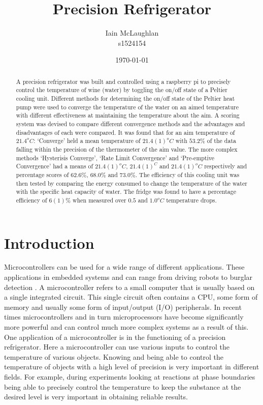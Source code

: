 \documentclass[10pt]{article}
\title{Precision Refrigerator}
\author{Iain McLaughlan\\ s1524154 }
\date{\today}
\begin{document}
\maketitle
\begin{abstract}
A precision refrigerator was built and controlled using a raspberry pi to precisely control the temperature of wine (water) by toggling the on/off state of a Peltier\cite{peltier}\cite{pelt} cooling unit. Different methods for determining the on/off state of the Peltier heat pump were used to converge the temperature of the water on an aimed temperature with different effectiveness at maintaining the temperature about the aim. A scoring system was devised to compare different convergence methods and the advantages and disadvantages of each were compared. It was found that for an aim temperature of $21.4^oC$: `Converge' held a mean temperature of $21.4(1)^oC$ with $53.2\%$ of the data falling within the precision of the thermometer of the aim value. The more complex methods `Hysterisis Converge', `Rate Limit Convergence' and `Pre-emptive Convergence' had a means of $21.4(1)^oC$, $21.4(1)^C$ and $21.4(1)^oC$ respectively and percentage scores of $62.6\%$, $68.0\%$ and $73.0\%$. The efficiency of this cooling unit was then tested by comparing the energy consumed to change the temperature of the water with the specific heat capacity of water. The fridge was found to have a percentage efficiency of $6(1)\%$ when measured over $0.5$ and $1.0^oC$ temperature drops.
\end{abstract}

\section*{Introduction}
Microcontrollers can be used for a wide range of different applications. These applications in embedded systems and can range from driving robots\cite{robomicro} to burglar detection \cite{microburg}. A microcontroller refers to a small computer that is usually based on a single integrated circuit. This single circuit often contains a CPU, some form of memory and usually some form of input/output (I/O) peripherals. In recent times microcontrollers and in turn microprocessors have become significantly more powerful and can control much more complex systems as a result of this.\\

One application of a microcontroller is in the functioning of a precision refrigerator. Here a microcontroller can use various inputs to control the temperature of various objects. Knowing and being able to control the temperature of objects with a high level of precision is very important in different fields. For example, during experiments looking at reactions at phase boundaries\cite{microfluidic} being able to precisely control the temperature to keep the substance at the desired level is very important in obtaining reliable results.\\
\end{document}
